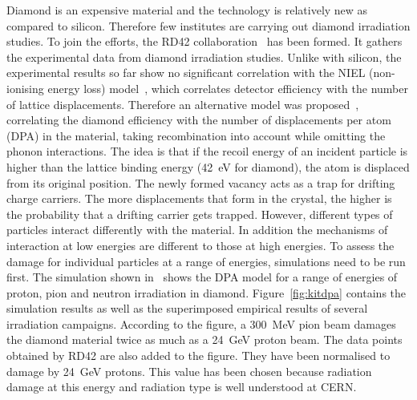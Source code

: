 Diamond is an expensive material and the technology is relatively new as compared to silicon. Therefore few institutes are carrying out diamond irradiation studies. To join the efforts, the RD42 collaboration~\cite{RD42:00000} has been formed. It gathers the experimental data from diamond irradiation studies. Unlike with silicon, the experimental results so far show no significant correlation with the NIEL (non-ionising energy loss) model~\cite{2002NIMPA}, which correlates detector efficiency with the number of lattice displacements. Therefore an alternative model was proposed~\cite{Guthoff:2014223}, correlating the diamond efficiency with the number of displacements per atom (DPA) in the material, taking recombination into account while omitting the phonon interactions. The idea is that if the recoil energy of an incident particle is higher than the lattice binding energy (42~eV for diamond), the atom is displaced from its original position. The newly formed vacancy acts as a trap for drifting charge carriers. The more displacements that form in the crystal, the higher is the probability that a drifting carrier gets trapped. However, different types of particles interact differently with the material. In addition the mechanisms of interaction at low energies are different to those at high energies. To assess the damage for individual particles at a range of energies, simulations need to be run first. The simulation shown in~\cite{Guthoff:2014223} shows the DPA model for a range of energies of proton, pion and neutron irradiation in diamond. Figure~\ref{fig:kitdpa}  contains the simulation results as well as the superimposed empirical results of several irradiation campaigns. According to the figure, a 300~MeV pion beam damages the diamond material twice as much as a 24~GeV proton beam. The data points obtained by RD42 are also added to the figure. They have been normalised to damage by 24~GeV protons. This value has been chosen because radiation damage at this energy and radiation type is well understood at CERN.

